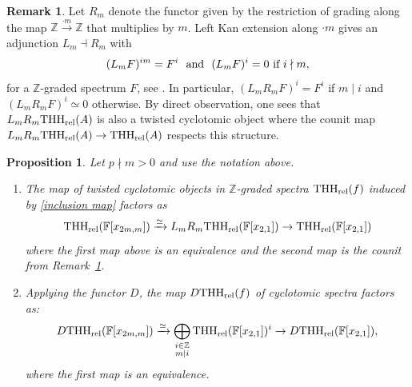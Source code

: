 \documentclass[english,10pt]{amsart}
\newcommand{\rel}{\textup{rel}}
\newcommand{\field}{\mathbb{F}}
\newtheorem{prop}{Proposition}[section]
\theoremstyle{definition}
\newtheorem{rema}{Remark}[section]
\numberwithin{equation}{section}
\newcommand{\rthh}{\mathrm{THH}_{\rel}}
\newcommand{\z}{\mathbb{Z}}
\begin{document}
\begin{rema}\label{rema rm and lm}
Let $R_m$ denote the functor given by the restriction of grading along the map $\z\xrightarrow{\cdot m} \z$ that multiplies by $m$. Left Kan extension along $\cdot m$ gives an adjunction $L_m\dashv R_m$ with 
\[(L_m F)^{im} = F^{i} \textup{\ \ and \ } (L_mF)^{i}= 0 \textup{\ if $i\nmid m$},\]
for a $\z$-graded spectrum $F$, see \cite[Section 2.2]{ausoni2022adjroot}.
In particular, $(L_mR_m F)^i = F^i$ if $m \mid i$ and  $(L_mR_m F)^i \simeq 0$ otherwise. 
By direct observation, one sees that $L_mR_m\rthh(A)$ is also a twisted cyclotomic object where the counit map $L_mR_m\rthh(A) \to \rthh(A)$ respects this structure. 
\end{rema}
\begin{prop}\label{prop root adjunction in thh}
        Let $p \nmid m>0$ and use the notation above. 
\begin{enumerate}
\item \label{it:twisted-cyclotomic-factorization1}
The map of twisted cyclotomic objects in $\z$-graded  spectra $\rthh(f)$ induced by \eqref{inclusion map} factors as 
\[
\rthh(\field[x_{2m,m}]) \xrightarrow{\simeq} L_mR_m \rthh(\field[x_{2,1}]) \to \rthh(\field[x_{2,1}])
\]
where the first map above is an equivalence and the second map is the counit from Remark~\ref{rema rm and lm}.  

\item \label{it:twisted-cyclotomic-factorization2} Applying the functor $D$, the map $D\rthh(f)$ of cyclotomic spectra factors as:
\[D \rthh(\field[x_{2m,m}]) \xrightarrow{\simeq} \bigoplus_{ \substack{i \in \z \\ m \mid i}} \rthh(\field[x_{2,1}])^i \to D \rthh(\field[x_{2,1}]),\]
where the first map is an equivalence. 
\end{enumerate}
\end{prop}
\end{document}
